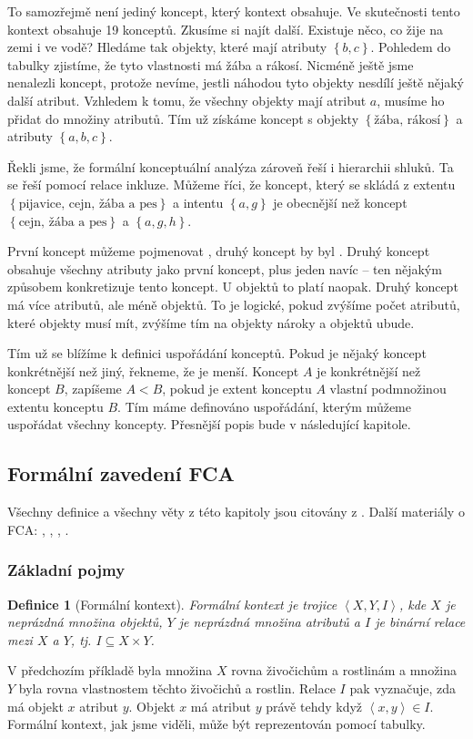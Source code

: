 \documentclass[12pt]{article}
\newcommand{\ssection}[1]{\subsection{#1}}
\newcommand{\sssection}[1]{\subsubsection{#1}}
\newcommand{\adds}[1]{\left\{#1\right\}}
\newcommand{\addsp}[1]{\left<#1\right>}
\newtheorem{mydef}{Definice}
\begin{document}
To samozřejmě není jediný koncept, který kontext obsahuje. Ve skutečnosti tento kontext obsahuje 19 konceptů. Zkusíme si najít další. Existuje něco, co žije na zemi i ve vodě? Hledáme tak objekty, které mají atributy $\adds{b, c}$. Pohledem do tabulky zjistíme, že tyto vlastnosti má žába a rákosí. Nicméně ještě jsme nenalezli koncept, protože nevíme, jestli náhodou tyto objekty nesdílí ještě nějaký další atribut. Vzhledem k tomu, že všechny objekty mají atribut $a$, musíme ho přidat do množiny atributů. Tím už získáme koncept s objekty $\adds{\mbox{žába, rákosí}}$ a atributy $\adds{a, b, c}$.

Řekli jsme, že formální konceptuální analýza zároveň řeší i hierarchii shluků. Ta se řeší pomocí relace inkluze. Můžeme říci, že koncept, který se skládá z extentu $\adds{\mbox{pijavice, cejn, žába a pes}}$ a intentu $\adds{a, g}$ je obecnější než koncept $\adds{\mbox{cejn, žába a pes}}$ a $\adds{a, g, h}$. 

První koncept můžeme pojmenovat , druhý koncept by byl . Druhý koncept obsahuje všechny atributy jako první koncept, plus jeden navíc -- ten nějakým způsobem konkretizuje tento koncept. U objektů to platí naopak. Druhý koncept má více atributů, ale méně objektů. To je logické, pokud zvýšíme počet atributů, které objekty musí mít, zvýšíme tím na objekty nároky a objektů ubude. 

Tím už se blížíme k definici uspořádání konceptů. Pokud je nějaký koncept konkrétnější než jiný, řekneme, že je menší. Koncept $A$ je konkrétnější než koncept $B$, zapíšeme $A < B$, pokud je extent konceptu $A$ vlastní podmnožinou extentu konceptu $B$. Tím máme definováno uspořádání, kterým můžeme uspořádat všechny koncepty. Přesnější popis bude v následující kapitole. 

\ssection{Formální zavedení FCA}

Všechny definice a všechny věty z této kapitoly jsou citovány z \cite{belfcaskr}. Další materiály o FCA: \cite{fcabook}, \cite{fcaslajdy1}, \cite{fcaslajdy2}, \cite{fcaslajdy3}.

\sssection{Základní pojmy}
\begin{mydef}[Formální kontext]
Formální kontext je trojice $\addsp{X, Y, I}$, kde $X$ je neprázdná množina objektů, $Y$ je neprázdná množina atributů a $I$ je binární relace mezi $X$ a $Y$, tj. $I\subseteq X\times Y$.
\end{mydef}

V předchozím příkladě byla množina $X$ rovna živočichům a rostlinám a množina $Y$ byla rovna vlastnostem těchto živočichů a rostlin. Relace $I$ pak vyznačuje, zda má objekt $x$ atribut $y$. Objekt $x$ má atribut $y$ právě tehdy když $\addsp{x, y}\in I$. Formální kontext, jak jsme viděli, může být reprezentován pomocí tabulky. 
\end{document}
